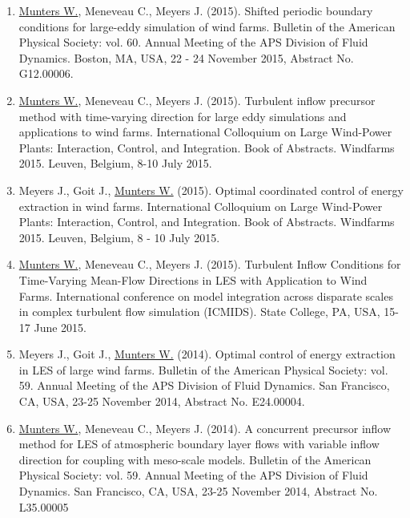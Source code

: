 \begin{enumerate}
\item \underline{Munters W.}, Meneveau C., Meyers J. (2015). Shifted periodic boundary conditions for large-eddy simulation of wind farms. Bulletin of the American Physical Society: vol. 60. Annual Meeting of the APS Division of Fluid Dynamics. Boston, MA, USA, 22 - 24 November 2015, Abstract No. G12.00006.

\item \underline{Munters W.}, Meneveau C., Meyers J. (2015). Turbulent inflow precursor method with time-varying direction for large eddy simulations and applications to wind farms. International Colloquium on Large Wind-Power Plants: Interaction, Control, and Integration. Book of Abstracts. Windfarms 2015. Leuven, Belgium, 8-10 July 2015.

\item Meyers J., Goit J., \underline{Munters W.} (2015). Optimal coordinated control of energy extraction in wind farms. International Colloquium on Large Wind-Power Plants: Interaction, Control, and Integration. Book of Abstracts. Windfarms 2015. Leuven, Belgium, 8 - 10 July 2015.

\item \underline{Munters W.}, Meneveau C., Meyers J. (2015). Turbulent Inflow Conditions for Time-Varying Mean-Flow Directions in LES with Application to Wind Farms. International conference on model integration across disparate scales in complex turbulent flow simulation (ICMIDS). State College, PA, USA, 15-17 June 2015.

\item Meyers J., Goit J., \underline{Munters W.} (2014). Optimal control of energy extraction in LES of large wind farms. Bulletin of the American Physical Society: vol. 59. Annual Meeting of the APS Division of Fluid Dynamics. San Francisco, CA, USA, 23-25 November 2014, Abstract No. E24.00004.

\item \underline{Munters W.}, Meneveau C., Meyers J. (2014). A concurrent precursor inflow method for LES of atmospheric boundary layer flows with variable inflow direction for coupling with meso-scale models. Bulletin of the American Physical Society: vol. 59. Annual Meeting of the APS Division of Fluid Dynamics. San Francisco, CA, USA, 23-25 November 2014, Abstract No. L35.00005
\end{enumerate}
\cleardoublepage

